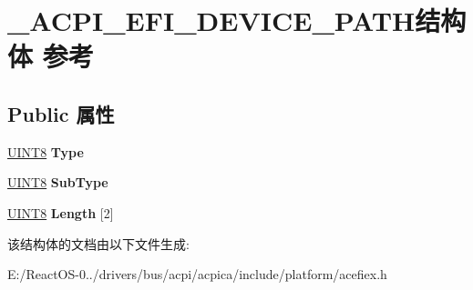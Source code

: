 \hypertarget{struct___a_c_p_i___e_f_i___d_e_v_i_c_e___p_a_t_h}{}\section{\+\_\+\+A\+C\+P\+I\+\_\+\+E\+F\+I\+\_\+\+D\+E\+V\+I\+C\+E\+\_\+\+P\+A\+T\+H结构体 参考}
\label{struct___a_c_p_i___e_f_i___d_e_v_i_c_e___p_a_t_h}
\subsection*{Public 属性}
\begin{DoxyCompactItemize}
\item 
\mbox{\label{struct___a_c_p_i___e_f_i___d_e_v_i_c_e___p_a_t_h_a31b95add10fd2793fec375262a513e9b}} 
\hyperlink{_processor_bind_8h_ab27e9918b538ce9d8ca692479b375b6a}{U\+I\+N\+T8} {\bfseries Type}
\item 
\mbox{\label{struct___a_c_p_i___e_f_i___d_e_v_i_c_e___p_a_t_h_aec74fba1199bc8ad8399f41e4052f9b4}} 
\hyperlink{_processor_bind_8h_ab27e9918b538ce9d8ca692479b375b6a}{U\+I\+N\+T8} {\bfseries Sub\+Type}
\item 
\mbox{\label{struct___a_c_p_i___e_f_i___d_e_v_i_c_e___p_a_t_h_a3ddde8b68023f587f9a7618d8d86f7cc}} 
\hyperlink{_processor_bind_8h_ab27e9918b538ce9d8ca692479b375b6a}{U\+I\+N\+T8} {\bfseries Length} \mbox{[}2\mbox{]}
\end{DoxyCompactItemize}


该结构体的文档由以下文件生成\+:\begin{DoxyCompactItemize}
\item 
E\+:/\+React\+O\+S-\/0../drivers/bus/acpi/acpica/include/platform/acefiex.\+h\end{DoxyCompactItemize}

